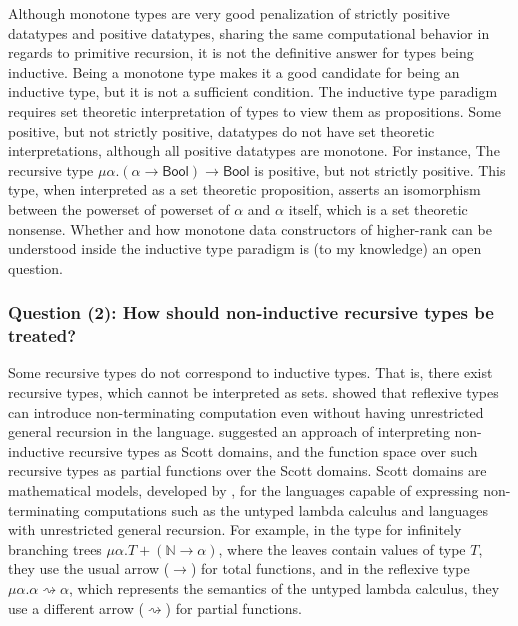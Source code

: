 Although monotone types are very good penalization of
strictly positive datatypes and positive datatypes,
sharing the same computational behavior in regards to primitive recursion,
it is not the definitive answer for types being inductive.
Being a monotone type makes it a good candidate for being an inductive type,
but it is not a sufficient condition. The inductive type paradigm requires
set theoretic interpretation of types to view them as propositions.
Some positive, but not strictly positive, datatypes do not have set theoretic
interpretations, although all positive datatypes are monotone. For instance,
The recursive type $\mu \alpha.(\alpha\to\textsf{Bool})\to\textsf{Bool}$ is
positive, but not strictly positive. This type, when interpreted as
a set theoretic proposition, asserts an isomorphism between
the powerset of powerset of $\alpha$ and $\alpha$ itself,
which is a set theoretic nonsense.
Whether and how monotone data constructors of higher-rank can be understood
inside the inductive type paradigm is (to my knowledge) an open question.

\subsubsection*{Question (2): How should non-inductive recursive types be treated?}

Some recursive types do not correspond to inductive types. That is, there exist
recursive types, which cannot be interpreted as sets. \citet{Mendler87}
showed that reflexive types can introduce non-terminating computation
even without having unrestricted general recursion in the language.
\citet{ConMen85} suggested an approach of interpreting
non-inductive recursive types as Scott domains, and the function space over
such recursive types as partial functions over the Scott domains.
Scott domains are mathematical models, developed by \citet{Sco76},
for the languages capable of expressing non-terminating computations such as
the untyped lambda calculus and languages with unrestricted general recursion.
For example, in the type for infinitely branching trees
$\mu \alpha. T + (\mathbb{N}\to\alpha)$, where the leaves contain values of
type $T$, they use the usual arrow ($\to$) for total functions, and in
the reflexive type $\mu \alpha. \alpha \rightsquigarrow \alpha$,
which represents the semantics of the untyped lambda calculus,
they use a different arrow ($\rightsquigarrow$) for partial functions.

